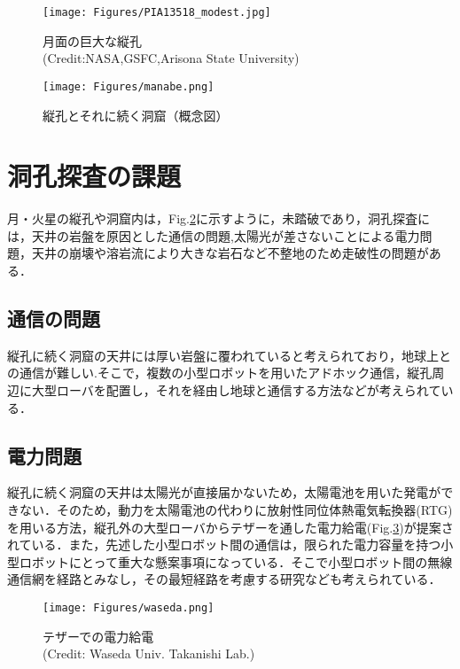 \documentclass[a4paper,11pt,dvipdfmx.uplatex]{jsarticle}
\begin{document}
\vspace*{0.5pt}
\begin{figure}[H]
\centering
  \texttt{[image: Figures/PIA13518\_modest.jpg]}
  \caption{
  月面の巨大な縦孔\cite{kireinalavatuve}\\
  (Credit:NASA,GSFC,Arisona State University)}
  \label{月面縦孔}
\end{figure}

\begin{figure}[htbp]
  \centering
  \texttt{[image: Figures/manabe.png]}
  \caption{縦孔とそれに続く洞窟（概念図）\cite{眞部}}
  \label{縦孔概念図}
\end{figure}



\section{洞孔探査の課題}
月・火星の縦孔や洞窟内は，Fig.\ref{縦孔概念図}に示すように，未踏破であり，洞孔探査には，天井の岩盤を原因とした通信の問題,太陽光が差さないことによる電力問題，天井の崩壊や溶岩流により大きな岩石など不整地のため走破性の問題がある． 
\subsection{通信の問題}
縦孔に続く洞窟の天井には厚い岩盤に覆われていると考えられており，地球上との通信が難しい.そこで，複数の小型ロボットを用いたアドホック通信\cite{Energy}，縦孔周辺に大型ローバを配置し，それを経由し地球と通信する方法\cite{DAEDALUS}などが考えられている．


\subsection{電力問題}
縦孔に続く洞窟の天井は太陽光が直接届かないため，太陽電池を用いた発電ができない．そのため，動力を太陽電池の代わりに放射性同位体熱電気転換器(RTG)を用いる方法，縦孔外の大型ローバからテザーを通した電力給電\cite{DuAxel}\cite{DAEDALUS}(Fig.\ref{waseda})が提案されている．また，先述した小型ロボット間の通信は，限られた電力容量を持つ小型ロボットにとって重大な懸案事項になっている．そこで小型ロボット間の無線通信網を経路とみなし，その最短経路を考慮する研究なども考えられている\cite{Energy}．


\begin{figure}[htbp]
\centering
  \texttt{[image: Figures/waseda.png]}
  \caption{テザーでの電力給電 \\(Credit: Waseda Univ. Takanishi Lab.)}
  \label{waseda}
\end{figure}
\end{document}
